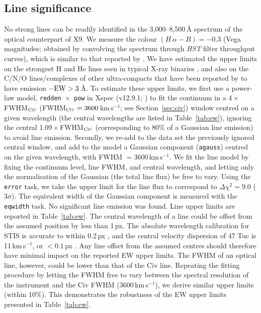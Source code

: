 \documentclass[a4paper,fleqn,usenatbib]{mnras}
\begin{document}
\subsection{Line significance}
\label{sec:lines}
No strong lines can be readily identified in the 3,000--8,500\,{\AA} spectrum of the optical counterpart of X9. We measure the colour $(H\,\alpha - B) = -0.3$ (Vega magnitudes; obtained by convolving the spectrum through {\it HST} filter throughput curves), which is similar to that reported by \citet{2015MNRAS.453.3918M}. We have estimated the upper limits on the strongest H and He lines seen in typical X-ray binaries \citep{1996MNRAS.282.1437S}, and also on the C/N/O lines/complexes of other ultra-compacts that have been reported by \citet{2004MNRAS.348L...7N} to have emission $\rm -EW > 3$\,{\AA}. To estimate these upper limits, we first use a power-law model, \texttt{redden\,$\times$\,pow} in {\sc Xspec} (v12.9.1; \citealp{1996ASPC..101...17A}) to fit the continuum in a 4\,$\times$\,FWHM$_{\rm C{\textsc{iv}}}$ (FWHM$_{\rm C{\textsc{iv}}} = 3600$\,km\,s$^{-1}$; see Section~\ref{sec:civ}) window centred on a given wavelength (the central wavelengths are listed in Table~\ref{tab:ew}), ignoring the central 1.09\,$\times$\,FWHM$_{\rm C{\textsc{iv}}}$ (corresponding to 80\% of a Gaussian line emission) to avoid line emission. Secondly, we re-add to the data set the previously ignored central window, and add to the model a Gaussian component (\texttt{agauss}) centred on the given wavelength, with FWHM $= 3600$\,km\,s$^{-1}$. We fit the line model by fixing the continuum level, line FWHM, and central wavelength, and letting only the normalisation of the Gaussian (the total line flux) be free to vary. Using the {\tt error} task, we take the upper limit for the line flux to correspond to $\Delta \chi^2 = 9.0$ ($3\sigma$). The equivalent width of the Gaussian component is measured with the \texttt{eqwidth} task. No significant line emission was found. Line upper limits are reported in Table~\ref{tab:ew}. The central wavelength of a line could be offset from the assumed position by less than 1\,px. The absolute wavelength calibration for STIS is accurate to within 0.2\,px \citep{1998PASP..110.1183W}, and the central velocity dispersion of 47 Tuc is 11\,km\,s$^{-1}$, or $< 0.1$\,px \citep{1996AJ....112.1487H}. Any line offset from the assumed centres should therefore have minimal impact on the reported EW upper limits. The FWHM of an optical line, however, could be lower than that of the C{\sc iv} line. Repeating the fitting procedure by letting the FWHM free to vary between the spectral resolution of the instrument and the C{\sc iv} FWHM (3600\,km\,s$^{-1}$), we derive similar upper limits (within 10\%). This demonstrates the robustness of the EW upper limits presented in Table~\ref{tab:ew}.
\end{document}
